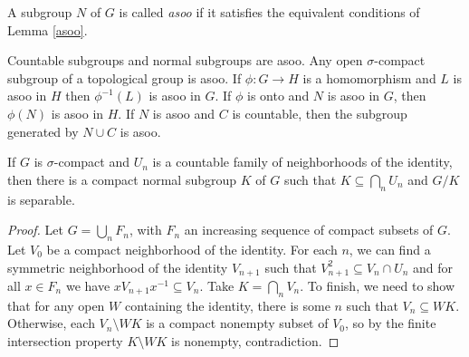 \documentclass[letterpaper,11pt]{report}
\begin{document}
\begin{defn} A subgroup $N$ of $G$ is called \emph{asoo} if it satisfies the equivalent conditions of Lemma \ref{asoo}.
\end{defn}

\begin{prop} Countable subgroups and normal subgroups are asoo. Any open $\sigma$-compact subgroup of a topological group is asoo. If $\phi : G \rightarrow H$ is a homomorphism and $L$ is asoo in $H$ then $\phi^{-1}(L)$ is asoo in $G$. If $\phi$ is onto and $N$ is asoo in $G$, then $\phi(N)$ is asoo in $H$. If $N$ is asoo and $C$ is countable, then the subgroup generated by $N \cup C$ is asoo.
\end{prop}

\begin{prop} If $G$ is $\sigma$-compact and $U_n$ is a countable family of neighborhoods of the identity, then there is a compact normal subgroup $K$ of $G$ such that $K \subseteq \bigcap_n U_n$ and $G/K$ is separable.
\end{prop}
\begin{proof} Let $G = \bigcup_n F_n$, with $F_n$ an increasing sequence of compact subsets of $G$. Let $V_0$ be a compact neighborhood of the identity. For each $n$, we can find a symmetric neighborhood of the identity $V_{n+1}$ such that $V_{n+1}^2 \subseteq V_n \cap U_n$ and for all $x \in F_n$ we have $xV_{n+1}x^{-1} \subseteq V_n$. Take $K = \bigcap_n V_n$. To finish, we need to show that for any open $W$ containing the identity, there is some $n$ such that $V_n \subseteq WK$. Otherwise, each $V_n \setminus WK$ is a compact nonempty subset of $V_0$, so by the finite intersection property $K \setminus WK$ is nonempty, contradiction.
\end{proof}
\end{document}
